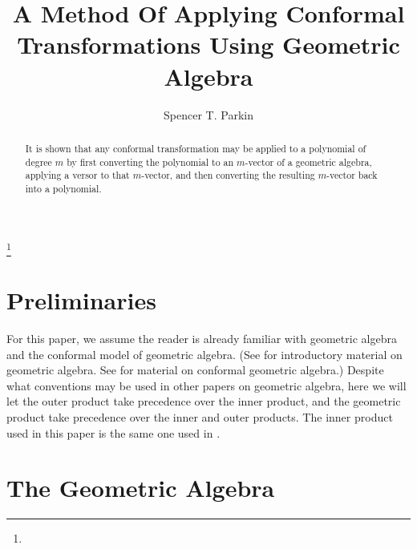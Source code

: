\documentclass{ecgd-l}
\theoremstyle{definition}
\theoremstyle{remark}
\numberwithin{equation}{section}
\begin{document}
\title{A Method Of Applying Conformal Transformations Using Geometric Algebra}


\author{Spencer T. Parkin}
\address{Put Address Here}
\curraddr{}
\email{}
\thanks{}


\date{}

\dedicatory{}

\begin{abstract}
It is shown that any conformal transformation may be applied to a polynomial
of degree $m$
by first converting the polynomial to an $m$-vector of a geometric algebra,
applying a versor to that $m$-vector, and then converting the resulting $m$-vector
back into a polynomial.
\end{abstract}

\maketitle

\section{Preliminaries}

For this paper, we assume the reader is already familiar with geometric algebra and the
conformal model of geometric algebra.
(See \cite{} for introductory material on geometric algebra.  See \cite{} for material
on conformal geometric algebra.)  Despite what conventions
may be used in other papers on geometric algebra, here we will let the outer product
take precedence over the inner product, and the geometric product take precedence
over the inner and outer products.  The inner product used in this paper is the
same one used in \cite{}.

\section{The Geometric Algebra}
\end{document}
